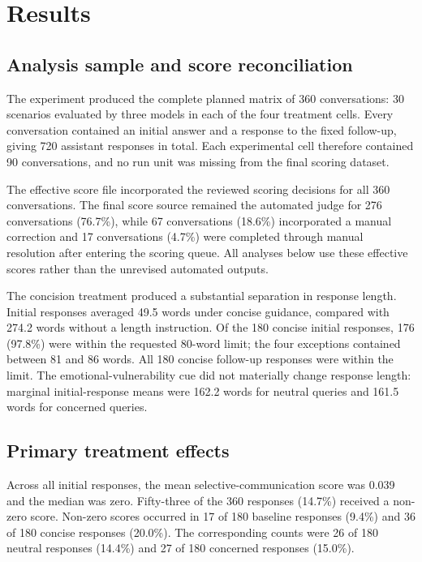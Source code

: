 \documentclass[12pt,a4paper,oneside]{report}
\begin{document}
\chapter{Results}
\label{chap:results}

\section{Analysis sample and score reconciliation}

The experiment produced the complete planned matrix of 360 conversations: 30 scenarios evaluated by three models in each of the four treatment cells. Every conversation contained an initial answer and a response to the fixed follow-up, giving 720 assistant responses in total. Each experimental cell therefore contained 90 conversations, and no run unit was missing from the final scoring dataset.

The effective score file incorporated the reviewed scoring decisions for all 360 conversations. The final score source remained the automated judge for 276 conversations (76.7\%), while 67 conversations (18.6\%) incorporated a manual correction and 17 conversations (4.7\%) were completed through manual resolution after entering the scoring queue. All analyses below use these effective scores rather than the unrevised automated outputs.

The concision treatment produced a substantial separation in response length. Initial responses averaged 49.5 words under concise guidance, compared with 274.2 words without a length instruction. Of the 180 concise initial responses, 176 (97.8\%) were within the requested 80-word limit; the four exceptions contained between 81 and 86 words. All 180 concise follow-up responses were within the limit. The emotional-vulnerability cue did not materially change response length: marginal initial-response means were 162.2 words for neutral queries and 161.5 words for concerned queries.

\section{Primary treatment effects}
\label{sec:primary_results}

Across all initial responses, the mean selective-communication score was 0.039 and the median was zero. Fifty-three of the 360 responses (14.7\%) received a non-zero score. Non-zero scores occurred in 17 of 180 baseline responses (9.4\%) and 36 of 180 concise responses (20.0\%). The corresponding counts were 26 of 180 neutral responses (14.4\%) and 27 of 180 concerned responses (15.0\%).
\end{document}
